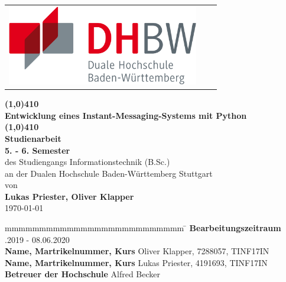 \documentclass[a4paper,titlepage,halfparskip,12pt]{scrreprt}
\newcommand{\titel}{\line(1,0){410}\\ \bigskip Entwicklung eines Instant-Messaging-Systems mit Python\\\bigskip \line(1,0){410}}
\begin{document}
\begin{table}[h]
\centering
\begin{tabular}{lcr}
\includegraphics[height=3.5cm]{images/dhbw-logo}
\end{tabular}
\end{table}
\bigskip
\bigskip
\begin{center}
\vspace*{12mm} {\LARGE\textbf{\titel}}\\
\vspace*{12mm} {\large\textbf{Studienarbeit}}\\
\vspace*{3mm} {\large\textbf{5. - 6. Semester}}\\
\vspace*{12mm} des Studiengangs Informationstechnik (B.Sc.)\\ an der Dualen Hochschule Baden-Württemberg Stuttgart\\
\vspace*{12mm} von\\
\vspace*{3mm} {\large\textbf{Lukas Priester, Oliver Klapper}}\\
\vspace*{12mm} \today\\
\end{center}
\vfill
\begin{spacing}{1.5}
\begin{tabbing}
mmmmmmmmmmmmmmmmmmmmmmmmmm \= \kill
\textbf{Bearbeitungszeitraum} .2019 - 08.06.2020\\
\textbf{Name, Martrikelnummer, Kurs} \> Oliver Klapper, 7288057, TINF17IN \\
\textbf{Name, Martrikelnummer, Kurs} \> Lukas Priester, 4191693, TINF17IN \\
\textbf{Betreuer der Hochschule} \> Alfred Becker\\
\end{tabbing}
\end{spacing}
\newpage
\end{document}
